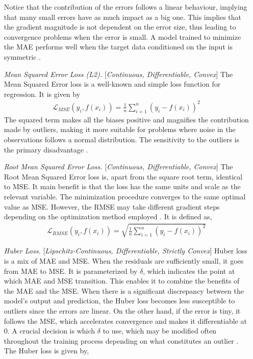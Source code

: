 \documentclass[nobib]{tufte-handout} %
\begin{document}
\begin{enumerate}
    Notice that the contribution of the errors follows a linear behaviour, implying that many small errors have as much impact as a big one. This implies that the gradient magnitude is not dependent on the error size, thus leading to convergence problems when the error is small. A model trained to minimize the MAE performs well when the target data conditioned on the input is symmetric \citep{ciampiconi2023survey}.
    \item[\it Mean Squared Error Loss (L2).][\textit{Continuous, Differentiable, Convex}] The Mean Squared Error loss is a well-known and simple loss function for regression. It is given by 
    \begin{equation}
      \begin{split}
        \mathcal{L}_{MSE}(y_i, f(x_i)) = \frac{1}{n} \sum^{n}_{i=1} (y_i-f(x_i))^2
      \end{split}
    \end{equation}
The squared term makes all the biases positive and magnifies the contribution made by outliers, making it more suitable for problems where noise in the observations follows a normal distribution. The sensitivity to the outliers is the primary disadvantage \citep{ciampiconi2023survey}.
    \item[\it Root Mean Squared Error Loss.][\textit{Continuous, Differentiable, Convex}] The Root Mean Squared Error loss is, apart from the square root term, identical to MSE. It main benefit is that the loss has the same units and scale as the relevant variable. The minimization procedure converges to the same optimal value as MSE. However, the RMSE may take different gradient steps depending on the optimization method employed \citep{ciampiconi2023survey}. It is defined as, 
    \begin{equation}
      \begin{split}
        \mathcal{L}_{RMSE}(y_i, f(x_i)) = \sqrt{\frac{1}{n} \sum^{n}_{i=1} (y_i-f(x_i))^2}
      \end{split}
    \end{equation}
    \item[\it Huber Loss.][\textit{Lipschitz-Continuous, Differentiable, Strictly Convex}] Huber loss is a mix of MAE and MSE. When the residuals are sufficiently small, it goes from MAE to MSE. It is parameterized by $\delta$, which indicates the point at which MAE and MSE transition. This enables it to combine the benefits of the MAE and the MSE. When there is a significant discrepancy between the model's output and prediction, the Huber loss becomes less susceptible to outliers since the errors are linear. On the other hand, if the error is tiny, it follows the MSE, which accelerates convergence and makes it differentiable at $0$. A crucial decision is which $\delta$ to use, which may be modified often throughout the training process depending on what constitutes an outlier \citep{ciampiconi2023survey}. The Huber loss is given by,

\end{enumerate}
\end{document}
